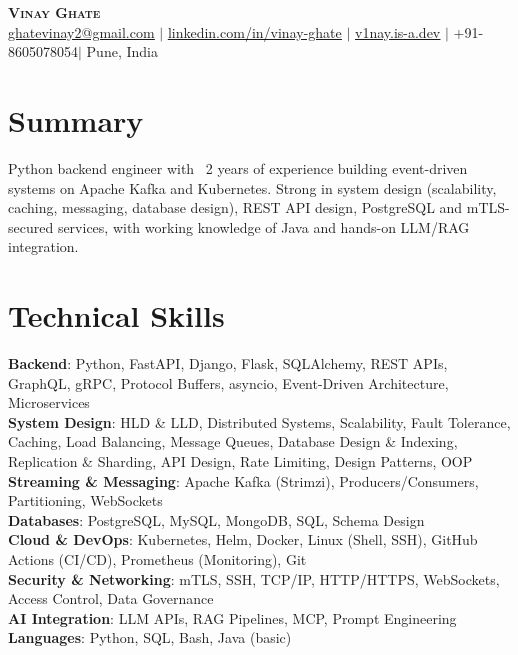 \documentclass[a4paper,11pt]{article}
\makeatletter
\newcommand{\emailAddr}{ghatevinay2@gmail.com}
\newcommand{\linkedinUrl}{https://linkedin.com/in/vinay-ghate}
\newcommand{\portfolioUrl}{https://v1nay.is-a.dev}
\newcommand{\phoneNumber}{+91-8605078054}
\makeatother
\begin{document}
\begin{center}
    \textbf{\Huge \scshape Vinay Ghate} \\ \vspace{4pt}
    \small \href{mailto:\emailAddr}{\underline{\emailAddr}} $|$
    \href{\linkedinUrl}{\underline{linkedin.com/in/vinay-ghate}} $|$
    \href{\portfolioUrl}{\underline{v1nay.is-a.dev}} $|$
    \phoneNumber $|$
    Pune, India
\end{center}

\section{Summary}
\small{Python backend engineer with ~2 years of experience building event-driven systems on Apache Kafka and Kubernetes. Strong in system design (scalability, caching, messaging, database design), REST API design, PostgreSQL and mTLS-secured services, with working knowledge of Java and hands-on LLM/RAG integration.}

\section{Technical Skills}
 \begin{itemize}[leftmargin=0.15in, label={}]
    \small{\item{
     \textbf{Backend}{: Python, FastAPI, Django, Flask, SQLAlchemy, REST APIs, GraphQL, gRPC, Protocol Buffers, asyncio, Event-Driven Architecture, Microservices} \\
     \textbf{System Design}{: HLD \& LLD, Distributed Systems, Scalability, Fault Tolerance, Caching, Load Balancing, Message Queues, Database Design \& Indexing, Replication \& Sharding, API Design, Rate Limiting, Design Patterns, OOP} \\
     \textbf{Streaming \& Messaging}{: Apache Kafka (Strimzi), Producers/Consumers, Partitioning, WebSockets} \\
     \textbf{Databases}{: PostgreSQL, MySQL, MongoDB, SQL, Schema Design} \\
     \textbf{Cloud \& DevOps}{: Kubernetes, Helm, Docker, Linux (Shell, SSH), GitHub Actions (CI/CD), Prometheus (Monitoring), Git} \\
     \textbf{Security \& Networking}{: mTLS, SSH, TCP/IP, HTTP/HTTPS, WebSockets, Access Control, Data Governance} \\
     \textbf{AI Integration}{: LLM APIs, RAG Pipelines, MCP, Prompt Engineering} \\
     \textbf{Languages}{: Python, SQL, Bash, Java (basic)}
    }}
 \end{itemize}
\end{document}
